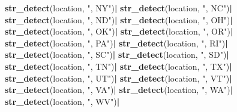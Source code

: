 \documentclass[
]{article}
\newenvironment{Shaded}{\begin{snugshade}}{\end{snugshade}}
\newcommand{\KeywordTok}[1]{\textcolor[rgb]{0.13,0.29,0.53}{\textbf{#1}}}
\newcommand{\NormalTok}[1]{#1}
\newcommand{\OperatorTok}[1]{\textcolor[rgb]{0.81,0.36,0.00}{\textbf{#1}}}
\newcommand{\StringTok}[1]{\textcolor[rgb]{0.31,0.60,0.02}{#1}}
\begin{document}
\begin{Shaded}
\begin{Highlighting}[]
{{\StringTok{                                                  }\KeywordTok{str_detect}\NormalTok{(location, }\StringTok{", NY"}\NormalTok{)}\OperatorTok{|}
\StringTok{                                                  }\KeywordTok{str_detect}\NormalTok{(location, }\StringTok{", NC"}\NormalTok{)}\OperatorTok{|}
\StringTok{                                                  }\KeywordTok{str_detect}\NormalTok{(location, }\StringTok{", ND"}\NormalTok{)}\OperatorTok{|}
\StringTok{                                                  }\KeywordTok{str_detect}\NormalTok{(location, }\StringTok{", OH"}\NormalTok{)}\OperatorTok{|}
\StringTok{                                                  }\KeywordTok{str_detect}\NormalTok{(location, }\StringTok{", OK"}\NormalTok{)}\OperatorTok{|}
\StringTok{                                                  }\KeywordTok{str_detect}\NormalTok{(location, }\StringTok{", OR"}\NormalTok{)}\OperatorTok{|}
\StringTok{                                                  }\KeywordTok{str_detect}\NormalTok{(location, }\StringTok{", PA"}\NormalTok{)}\OperatorTok{|}
\StringTok{                                                  }\KeywordTok{str_detect}\NormalTok{(location, }\StringTok{", RI"}\NormalTok{)}\OperatorTok{|}
\StringTok{                                                  }\KeywordTok{str_detect}\NormalTok{(location, }\StringTok{", SC"}\NormalTok{)}\OperatorTok{|}
\StringTok{                                                  }\KeywordTok{str_detect}\NormalTok{(location, }\StringTok{", SD"}\NormalTok{)}\OperatorTok{|}
\StringTok{                                                  }\KeywordTok{str_detect}\NormalTok{(location, }\StringTok{", TN"}\NormalTok{)}\OperatorTok{|}
\StringTok{                                                  }\KeywordTok{str_detect}\NormalTok{(location, }\StringTok{", TX"}\NormalTok{)}\OperatorTok{|}
\StringTok{                                                  }\KeywordTok{str_detect}\NormalTok{(location, }\StringTok{", UT"}\NormalTok{)}\OperatorTok{|}
\StringTok{                                                  }\KeywordTok{str_detect}\NormalTok{(location, }\StringTok{", VT"}\NormalTok{)}\OperatorTok{|}
\StringTok{                                                  }\KeywordTok{str_detect}\NormalTok{(location, }\StringTok{", VA"}\NormalTok{)}\OperatorTok{|}
\StringTok{                                                  }\KeywordTok{str_detect}\NormalTok{(location, }\StringTok{", WA"}\NormalTok{)}\OperatorTok{|}
\StringTok{                                                  }\KeywordTok{str_detect}\NormalTok{(location, }\StringTok{", WV"}\NormalTok{)}\OperatorTok{|}
}}
\end{Highlighting}
\end{Shaded}
\end{document}
